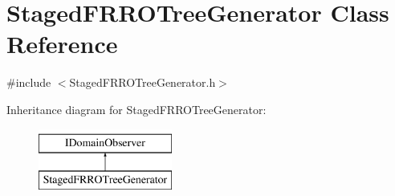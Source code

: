 \hypertarget{class_staged_f_r_r_o_tree_generator}{}\section{Staged\+F\+R\+R\+O\+Tree\+Generator Class Reference}
\label{class_staged_f_r_r_o_tree_generator}


{\ttfamily \#include $<$Staged\+F\+R\+R\+O\+Tree\+Generator.\+h$>$}

Inheritance diagram for Staged\+F\+R\+R\+O\+Tree\+Generator\+:\begin{figure}[H]
\begin{center}
\leavevmode
\includegraphics[height=2.000000cm]{d5/dd5/class_staged_f_r_r_o_tree_generator}
\end{center}
\end{figure}
